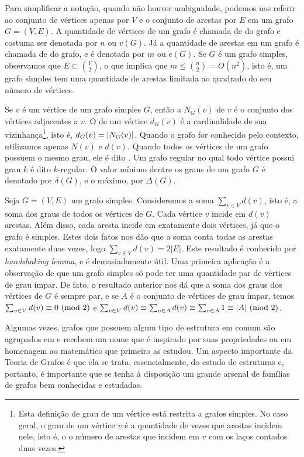 Para simplificar a notação, quando não houver ambiguidade, podemos nos referir ao conjunto de vértices apenas por $V$ e o conjunto de arestas por $E$ em um grafo $G = (V,E)$. A quantidade de vértices de um grafo é chamada de  do grafo e costuma ser denotada por $n$ ou $v(G)$. Já a quantidade de arestas em um grafo é chamada de  do grafo, e é denotada por $m$ ou $e(G)$. Se $G$ é um grafo simples, observamos que $E \subset \binom{V}{2}$, o que implica que $m \leq \binom{n}{2} = O(n^2)$, isto é, um grafo simples tem uma quantidade de arestas limitada ao quadrado do seu número de vértices.

Se $v$ é um vértice de um grafo simples $G$, então a  $N_G(v)$ de $v$ é o conjunto dos vértices adjacentes a $v$. O  de um vértice $d_G(v)$ é a cardinalidade de sua vizinhança\footnote{Esta definição de grau de um vértice está restrita a grafos simples. No caso geral, o grau de um vértice $v$ é a quantidade de vezes que arestas incidem nele, isto é, o o número de arestas que incidem em $v$ com os laços contados duas vezes.}, isto é, $d_G(v) = \left | N_G(v) \right |$. Quando o grafo for conhecido pelo contexto, utilizamos apenas $N(v)$ e $d(v)$. Quando todos os vértices de um grafo possuem o mesmo grau, ele é dito . Um grafo regular no qual todo vértice possui grau $k$ é dito $k$-regular. O valor mínimo dentre os graus de um grafo $G$ é denotado por $\delta(G)$, e o máximo, por $\Delta(G)$.

Seja $G = (V,E)$ um grafo simples. Consideremos a soma $\sum_{v \in V}d(v)$, isto é, a soma dos graus de todos os vértices de $G$. Cada vértice $v$ incide em $d(v)$ arestas. Além disso, cada aresta incide em exatamente dois vértices, já que o grafo é simples. Estes dois fatos nos dão que a soma conta todas as arestas exatamente duas vezes, logo $\sum_{v \in V}d(v) = 2|E|$. Este resultado é conhecido por \emph{handshaking lemma}, e é demasiadamente útil. Uma primeira aplicação é a observação de que um grafo simples só pode ter uma quantidade par de vértices de grau ímpar. De fato, o resultado anterior nos dá que a soma dos graus dos vértices de $G$ é sempre par, e se $A$ é o conjunto de vértices de grau ímpar, temos $\sum_{v \in V}d(v) \equiv 0 \ (\text{mod}\ 2)$ e $\sum_{v \in V}d(v) \equiv \sum_{v \in A}d(v) \equiv \sum_{v \in A}1 \equiv |A| \ (\text{mod}\ 2)$.

Algumas vezes, grafos que possuem algum tipo de estrutura em comum são agrupados em  e recebem um nome que é inspirado por suas propriedades ou em homenagem ao matemático que primeiro as estudou. Um aspecto importante da Teoria de Grafos é que ela se trata, essencialmente, do estudo de estruturas e, portanto, é importante que se tenha à disposição um grande arsenal de famílias de grafos bem conhecidas e estudadas.


